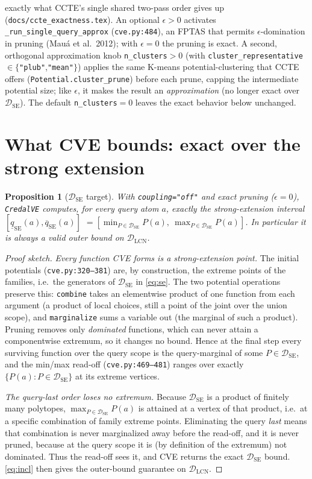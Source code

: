 \documentclass[11pt]{article}
\newtheorem{proposition}{Proposition}
\newcommand{\lo}{\underline}
\newcommand{\hi}{\overline}
\newcommand{\DSE}{\mathcal{D}_{\mathrm{SE}}}
\newcommand{\DLCN}{\mathcal{D}_{\mathrm{LCN}}}
\newcommand{\CVE}{\texttt{CredalVE}}
\begin{document}
exactly what CCTE's single shared two-pass order gives up (\texttt{docs/ccte\_exactness.tex}). An
optional $\epsilon>0$ activates \texttt{\_run\_single\_query\_approx} (\texttt{cve.py:484}), an
FPTAS that permits $\epsilon$-domination in pruning (Mau\'a et al.\ 2012); with $\epsilon=0$ the
pruning is exact. A second, orthogonal approximation knob \texttt{n\_clusters}$>0$ (with
\texttt{cluster\_representative} $\in\{$\texttt{"plub"},\texttt{"mean"}$\}$) applies the same
K-means potential-clustering that CCTE offers (\texttt{Potential.cluster\_prune}) before each prune,
capping the intermediate potential size; like $\epsilon$, it makes the result an \emph{approximation}
(no longer exact over $\DSE$). The default \texttt{n\_clusters}$=0$ leaves the exact behavior below
unchanged.

\section{What CVE bounds: exact over the strong extension}\label{sec:bounds}

\begin{proposition}[$\DSE$ target]\label{prop:se}
With \texttt{coupling="off"} and exact pruning ($\epsilon=0$), \CVE{} computes, for every query atom
$a$, exactly the strong-extension interval
$[\lo q_{\mathrm{SE}}(a),\hi q_{\mathrm{SE}}(a)]$
$=[\min_{P\in\DSE}P(a),\ \max_{P\in\DSE}P(a)]$. In particular it is always a valid \emph{outer}
bound on $\DLCN$.
\end{proposition}

\begin{proof}[Proof sketch]
\emph{Every function CVE forms is a strong-extension point.} The initial potentials
(\texttt{cve.py:320--381}) are, by construction, the extreme points of the families, i.e.\ the
generators of $\DSE$ in \eqref{eq:se}. The two potential operations preserve this: \texttt{combine}
takes an elementwise product of one function from each argument (a product of local choices, still a
point of the joint over the union scope), and \texttt{marginalize} sums a variable out (the marginal
of such a product). Pruning removes only \emph{dominated} functions, which can never attain a
componentwise extremum, so it changes no bound. Hence at the final step every surviving function
over the query scope is the query-marginal of some $P\in\DSE$, and the min/max read-off
(\texttt{cve.py:469--481}) ranges over exactly $\{P(a):P\in\DSE\}$ at its extreme vertices.

\emph{The query-last order loses no extremum.} Because $\DSE$ is a product of finitely many
polytopes, $\max_{P\in\DSE}P(a)$ is attained at a vertex of that product, i.e.\ at a specific
combination of family extreme points. Eliminating the query \emph{last} means that combination is
never marginalized away before the read-off, and it is never pruned, because at the query scope it
is (by definition of the extremum) not dominated. Thus the read-off sees it, and CVE returns the
exact $\DSE$ bound. \eqref{eq:incl} then gives the outer-bound guarantee on $\DLCN$.
\end{proof}
\end{document}
